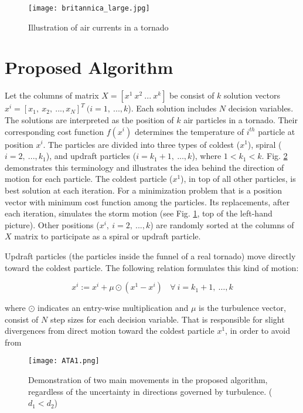 \documentclass[conference]{IEEEtran}
\begin{document}
\begin{figure}[h!]
 \centering
  \texttt{[image: britannica\_large.jpg]}
  \caption{Illustration of air currents in a tornado \cite{thunder16}}
  \label{tormor}
\end{figure}

\section{Proposed Algorithm}

Let the columns of matrix $X=[x^1~x^2~...~x^k]$ be consist of $k$ solution vectors $x^i=[x_1,~ x_2, ~..., x_N]^T~ (i=1,~...,k$). Each solution includes $N$ decision variables. The solutions are interpreted as the position of $k$ air particles in a tornado. Their corresponding cost function $f(x^i)$ determines the temperature of $i^{th}$ particle at position $x^i$. The particles are divided into three types of coldest ($x^1$), spiral ($i=2,~...,k_1$), and updraft particles ($i=k_1+1,~...,k$), where $1<k_1<k$. Fig. \ref{STO} demonstrates this terminology and illustrates the idea behind the direction of motion for each particle. The coldest particle ($x^1$), in top of all other particles, is best solution at each iteration. For a minimization problem that is a position vector with minimum cost function among the particles. Its replacements, after each iteration, simulates the storm motion (see Fig. \ref{tormor}, top of the left-hand picture). Other positions ($x^i,~i=2,~...,k$) are randomly sorted at the columns of $X$ matrix to participate as a spiral or updraft particle.

Updraft particles (the particles inside the funnel of a real tornado) move directly toward the coldest particle. The following relation formulates this kind of motion:

\begin{equation}\label{asan}
  x^i := x^i+\mu\odot(x^1-x^i)   ~ ~~~\forall~ i=k_1+1,~\ldots,k
\end{equation}

\noindent where $\odot$  indicates an entry-wise multiplication and $\mu$ is the turbulence vector, consist of $N$ step sizes for each decision variable. That is responsible for slight divergences from direct motion toward the coldest particle $x^1$, in order to avoid from

 \begin{figure}[h!]
 \centering
  \texttt{[image: ATA1.png]}
  \caption{Demonstration of two main movements in the proposed algorithm, regardless of the uncertainty in directions governed by turbulence. ($d_{1}<d_{2}$)}
  \label{STO}
\end{figure}
\end{document}
